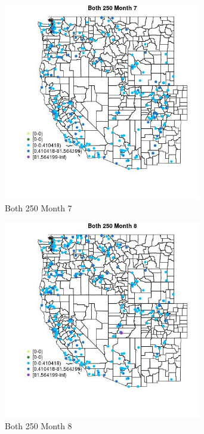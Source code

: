 \begin{figure} 
\centering  
\includegraphics[width=0.77\textwidth]{Code_Outputs/Report_ML_input_PM25_Step4_part_e_de_duplicated_aveswNAs_MapObsMo7Both_250.jpg} 
\caption{\label{fig:Report_ML_input_PM25_Step4_part_e_de_duplicated_aveswNAsMapObsMo7Both_250}Both 250 Month 7} 
\end{figure} 
 

\clearpage 

\begin{figure} 
\centering  
\includegraphics[width=0.77\textwidth]{Code_Outputs/Report_ML_input_PM25_Step4_part_e_de_duplicated_aveswNAs_MapObsMo8Both_250.jpg} 
\caption{\label{fig:Report_ML_input_PM25_Step4_part_e_de_duplicated_aveswNAsMapObsMo8Both_250}Both 250 Month 8} 
\end{figure} 
 


